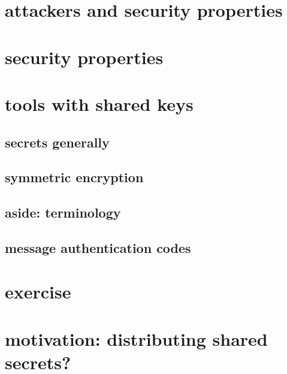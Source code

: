 
\section{attackers and security properties}


\section{security properties}


\section{tools with shared keys}

\subsection{secrets generally}


\subsection{symmetric encryption}

% 


% 

\subsection{aside: terminology}


\subsection{message authentication codes}


\section{exercise}


\section{motivation: distributing shared secrets?}


